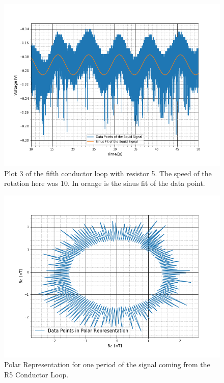 \begin{figure}[ht]
	\includegraphics[scale=0.5]{Bild/r5_10_2}
	\centering
	\caption[Plot of fifth conductor loop 3]{Plot 3 of the fifth conductor loop with resistor 5. The speed of the rotation here was 10. In orange is the sinus fit of the data point.}
\end{figure}
\begin{figure}[ht]
	\includegraphics[scale=0.5]{Bild/R5}
	\centering
	\caption[Polar Representation for R5 Conductor Loop]{Polar Representation for one period of the signal coming from the R5 Conductor Loop.}
\end{figure}
